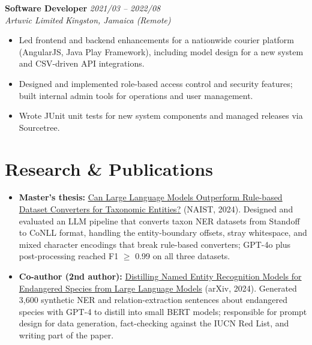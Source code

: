 \documentclass[10pt,letterpaper]{article}
\newcommand{\extlink}[2]{\href{#1}{\color{accent}#2}}
\newcommand{\role}[4]{%
  \textbf{#1} \hfill \textit{#3}\\
  \textit{#2} \hfill \textit{#4}\\[0pt]
}
\begin{document}
\vspace{0pt}
\role{Software Developer}{Artuvic Limited}{2021/03 -- 2022/08}{Kingston, Jamaica (Remote)}
\begin{itemize}
  \item Led frontend and backend enhancements for a nationwide courier platform (AngularJS, Java
    Play Framework), including model design for a new system and CSV-driven API integrations.
  \item Designed and implemented role-based access control and security features; built internal
    admin tools for operations and user management.
  \item Wrote JUnit unit tests for new system components and managed releases via Sourcetree.
\end{itemize}

\section*{Research \& Publications}
\begin{itemize}\sloppy
  \item \textbf{Master's thesis:} \extlink{https://library.naist.jp/opac/en/book/111663}{Can
    Large Language Models Outperform Rule-based Dataset Converters for Taxonomic Entities?} (NAIST,
    2024). Designed and evaluated an LLM pipeline that converts taxon NER datasets from Standoff to
    CoNLL format, handling the entity-boundary offsets, stray whitespace, and mixed character
    encodings that break rule-based converters; GPT-4o plus post-processing reached F1 $\geq$ 0.99
    on all three datasets.
  \item \textbf{Co-author (2nd author):} \extlink{https://arxiv.org/abs/2403.15430}{Distilling
    Named Entity Recognition Models for Endangered Species from Large Language Models} (arXiv,
    2024). Generated 3,600 synthetic NER and relation-extraction sentences about endangered species
    with GPT-4 to distill into small BERT models; responsible for prompt design for data generation,
    fact-checking against the IUCN Red List, and writing part of the paper.
\end{itemize}

\end{document}

